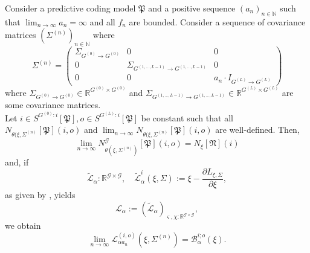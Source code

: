 \documentclass[a4paper,11pt]{report}
\newcommand{\const}{\varsigma} %
\newcommand{\var}{\chi} %
\begin{document}
\begin{Pro}\label{the:prediback}
Consider a predictive coding model $\mathfrak{P}$ and a positive sequence $(a_n)_{n\in\mathbb{N}}$ such that $\lim_{n\to\infty}a_n=\infty$ and all $f_n$ are bounded. Consider a sequence of covariance matrices $(\Sigma^{(n)})_{n\in\mathbb{N}}$ where
\[
\Sigma^{(n)}=\begin{pmatrix}
\Sigma_{G^{(0)}\to G^{(0)}} & 0 & 0 \\
0 & \Sigma_{G^{(1,\dotsc, L-1)}\to G^{(1,\dotsc, L-1)}} & 0 \\
0 & 0 & a_n\cdot I_{G^{(L)}\to G^{(L)}}
\end{pmatrix}
\]
where $\Sigma_{G^{(0)}\to G^{(0)}}\in\mathbb{R}^{G^{(0)}\times G^{(0)}}$ and $\Sigma_{G^{(1,\dotsc, L-1)}\to G^{(1,\dotsc, L-1)}}\in\mathbb{R}^{G^{(L)}\times G^{(L)}}$ are some covariance matrices.\\
Let $i\in S^{G^{(0)}:i}[\mathfrak{P}],o\in S^{G^{(L)}:i}[\mathfrak{P}]$ be constant such that all $N_{\theta(\xi,\Sigma^{(n)}}[\mathfrak{P}](i,o)$ and $\lim_{n\to\infty}N_{\theta(\xi,\Sigma^{(n)}}[\mathfrak{P}](i,o)$ are well-defined. Then,
\begin{equation}\label{eq:convadd}
\lim_{n\to\infty} N_{\theta(\xi,\Sigma^{(n)})}^{\mathcal{G}}[\mathfrak{P}](i,o)=N_{\xi}[\mathfrak{N}](i)
\end{equation}
and, if 
\[
\tilde{\mathcal{L}}_{\alpha}:\mathbb{R}^{\mathcal{G}\times\mathcal{G}},
\quad
\tilde{\mathcal{L}}_{\alpha}^i(\xi,\Sigma):=\xi-\frac{\partial L_{\xi,\Sigma}}{\partial\xi},
\]
as given by , yields
\[
\mathcal{L}_{\alpha}:=\left(\tilde{\mathcal{L}}_{\alpha}\right)_{\const,\var:\mathbb{R}^{\mathcal{G}\times\mathcal{G}}},
\]
we obtain
\begin{equation}\label{eq:prediback}
\lim_{n\to\infty}\mathcal{L}_{\alpha a_n}^{(i,o)}(\xi,\Sigma^{(n)})=\mathcal{B}_{\alpha}^{i;o}(\xi).
\end{equation}
\end{Pro}
\end{document}
